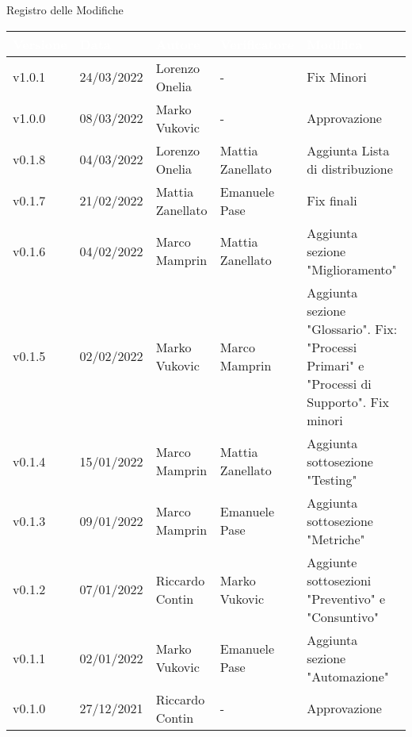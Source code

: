 \begin{center}
  \huge{Registro delle Modifiche}
\end{center}

\renewcommand\arraystretch{1,5}
{\centering
\begin{longtable}{|C{1.8cm}|C{2.1cm}|C{2cm}|C{2.4cm}|L{4.4cm}|}
  \hline
  \textcolor[HTML]{FFFFFF}{\textbf{Versione}} & \textcolor[HTML]{FFFFFF}{\textbf{Data}} & \textcolor[HTML]{FFFFFF}{\textbf{Autore}}  & \textcolor[HTML]{FFFFFF}{\textbf{Verificatore}} & \textcolor[HTML]{FFFFFF}{\textbf{Modifica}}    \\ \hline
  v1.0.1      & 24/03/2022    & Lorenzo Onelia  & -     & Fix Minori                \\ \hline
  v1.0.0     & 08/03/2022   & Marko Vukovic & - & Approvazione     \\ \hline
  v0.1.8      & 04/03/2022    & Lorenzo Onelia  & Mattia Zanellato     & Aggiunta Lista di distribuzione                  \\ \hline
  v0.1.7     & 21/02/2022    & Mattia Zanellato & Emanuele Pase         & Fix finali   \\ \hline
  v0.1.6     & 04/02/2022    & Marco Mamprin    & Mattia Zanellato      & Aggiunta sezione "Miglioramento"   \\ \hline
  v0.1.5     & 02/02/2022    & Marko Vukovic    & Marco Mamprin         & Aggiunta sezione "Glossario". Fix: "Processi Primari" e "Processi di Supporto". Fix minori   \\ \hline
  v0.1.4     & 15/01/2022    & Marco Mamprin    & Mattia Zanellato      & Aggiunta sottosezione "Testing"  \\ \hline
  v0.1.3     & 09/01/2022    & Marco Mamprin    & Emanuele Pase         & Aggiunta sottosezione "Metriche"  \\ \hline
  v0.1.2     & 07/01/2022    & Riccardo Contin  & Marko Vukovic         & Aggiunte sottosezioni "Preventivo" e "Consuntivo"  \\ \hline
  v0.1.1     & 02/01/2022    & Marko Vukovic    & Emanuele Pase         & Aggiunta sezione "Automazione"  \\ \hline
  v0.1.0     & 27/12/2021    & Riccardo Contin  & -                     & Approvazione  \\ \hline

\end{longtable}}
